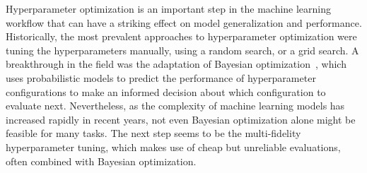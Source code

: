 Hyperparameter optimization is an important step in the machine learning workflow that can have a striking effect on model generalization and performance. Historically, the most prevalent approaches to hyperparameter optimization were tuning the hyperparameters manually, using a random search, or a grid search. A breakthrough in the field was the adaptation of Bayesian optimization~\cite{mockus1974bayesian,snoek2012practical}, which uses probabilistic models to predict the performance of hyperparameter configurations to make an informed decision about which configuration to evaluate next. Nevertheless, as the complexity of machine learning models has increased rapidly in recent years, not even Bayesian optimization alone might be feasible for many tasks. The next step seems to be the multi-fidelity hyperparameter tuning, which makes use of cheap but unreliable evaluations, often combined with Bayesian optimization.






